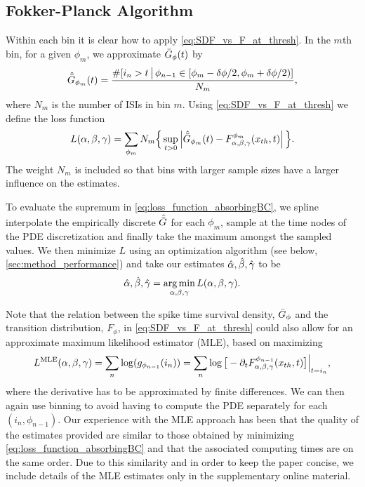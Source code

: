 \subsection{Fokker-Planck Algorithm}
Within each bin it is clear how to apply \cref{eq:SDF_vs_F_at_thresh}. In the
$m$th bin, for a given $\phi_m$, we approximate ${ \bar{G} }_{\phi}(t)$  by
\begin{equation}
{ \hat{{ \bar{G} }} }_{\phi_m}(t) =
 \frac{\#[i_n > t \, \big| \, \phi_{n-1} \in [\phi_m - { \delta \phi }/2,
\phi_m + { \delta \phi }/2) ]}{N_m},
\label{eq:SDF_estimate_per_bin}
\end{equation}
where $N_m$ is the number of ISIs in bin $m$. Using \cref{eq:SDF_vs_F_at_thresh}
we define the loss function
\begin{equation}
L(\alpha,\beta,{\gamma }) = 
\sum_{\phi_m} N_m \Big\{ 
\sup_{t>0} \left| { \hat{{ \bar{G} }} }_{\phi_m}(t) - F^{\phi_m}_{\alpha,\beta,{\gamma }}({ x_{th} },
t) \right| \Big \}.
\label{eq:loss_function_absorbingBC}
\end{equation}
The weight $N_m$ is included so that bins with larger sample sizes have a
larger influence on the estimates. 
 
To evaluate the supremum in \cref{eq:loss_function_absorbingBC}, we
spline interpolate the empirically discrete ${ \hat{{ \bar{G} }} }$ for each $\phi_m$, sample at
the time nodes of the PDE discretization and 
finally take the maximum amongst the sampled values.
We then minimize $L$ using an optimization algorithm (see below,
\cref{sec:method_performance}) and take our estimates ${{{ \hat{\alpha} }, { \hat{\beta} }, { \hat{{\gamma }} }} }$ to be
$$
\abgest = \argmin_{\abg} L(\abg).
$$

Note that the relation between the spike time survival density, ${ \bar{G} }_{\phi}$ and
the transition distribution, $F_{\phi}$, in \cref{eq:SDF_vs_F_at_thresh} could
also allow for an approximate maximum likelihood estimator (MLE), based on
maximizing 
$$
L^{\textrm{MLE}}(\alpha,\beta,{\gamma }) = \sum_n  \log ( g_{\phi_{n-1}}(i_n) )
= \sum_n \log \big[ -{\partial}_t F^{\phi_{n-1}}_{\alpha,\beta,{\gamma }}({ x_{th} }, t) \big] \Big|_{t =
i_n},
 $$ where the derivative has to be approximated by finite differences. We
can then again use binning to avoid having to compute the PDE separately for
each $(i_n, \phi_{n-1})$. Our experience with the MLE approach has been that the
quality of the estimates provided are similar to those obtained by minimizing
\cref{eq:loss_function_absorbingBC} and that the associated computing times are
on the same order. Due to this similarity and in order to keep the paper
concise, we include details of the MLE estimates only in the supplementary
online material.
